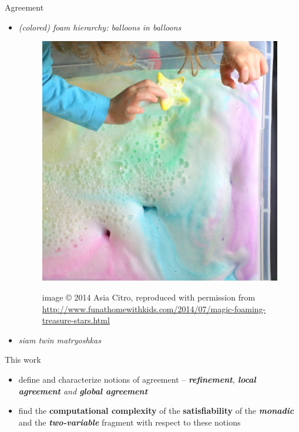 \documentclass{beamer}
\begin{document}
\begin{frame}{Agreement}
\begin{itemize}

\item \emph{(colored) foam hierarchy: balloons in balloons}
\begin{figure}
\includegraphics[scale=0.07]{1-IMG_4360.JPG}

{\tiny image © 2014 Asia Citro, reproduced with permission from \\
\url{http://www.funathomewithkids.com/2014/07/magic-foaming-treasure-stars.html}}
\end{figure}

\pause
\item \emph{siam twin matryoshkas}
\end{itemize}
\end{frame}
\begin{frame}{This work}
\begin{itemize}
  \item define and characterize notions of agreement --
  \emph{\textbf{refinement}, \textbf{local agreement} and \textbf{global
  agreement}}
  \item find the \textbf{computational complexity} of the
  \textbf{satisfiability} of the \emph{\textbf{monadic}} and the
  \emph{\textbf{two-variable}} fragment with respect to these notions
\end{itemize}
\end{frame}
\end{document}
